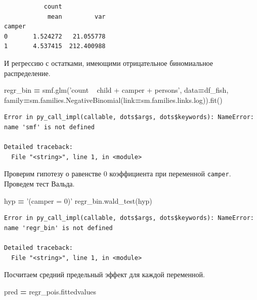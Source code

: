 \documentclass[]{book}
\newenvironment{Shaded}{\begin{snugshade}}{\end{snugshade}}
\newcommand{\NormalTok}[1]{#1}
\newcommand{\OperatorTok}[1]{\textcolor[rgb]{0.81,0.36,0.00}{\textbf{#1}}}
\newcommand{\StringTok}[1]{\textcolor[rgb]{0.31,0.60,0.02}{#1}}
\begin{document}
\begin{verbatim}
           count            
            mean         var
camper                      
0       1.524272   21.055778
1       4.537415  212.400988
\end{verbatim}

И регрессию с остатками, имеющими отрицательное биномиальное распределение.

\begin{Shaded}
\begin{Highlighting}[]
\NormalTok{regr_bin }\OperatorTok{=}\NormalTok{ smf.glm(}\StringTok{'count ~ child + camper +  persons'}\NormalTok{, data}\OperatorTok{=}\NormalTok{df_fish,}
\NormalTok{              family}\OperatorTok{=}\NormalTok{sm.families.NegativeBinomial(link}\OperatorTok{=}\NormalTok{sm.families.links.log)).fit()}
\end{Highlighting}
\end{Shaded}

\begin{verbatim}
Error in py_call_impl(callable, dots$args, dots$keywords): NameError: name 'smf' is not defined

Detailed traceback: 
  File "<string>", line 1, in <module>
\end{verbatim}

Проверим гипотезу о равенстве 0 коэффициента при переменной \texttt{camper}. Проведем тест Вальда.

\begin{Shaded}
\begin{Highlighting}[]
\NormalTok{hyp }\OperatorTok{=} \StringTok{'(camper = 0)'}
\NormalTok{regr_bin.wald_test(hyp)}
\end{Highlighting}
\end{Shaded}

\begin{verbatim}
Error in py_call_impl(callable, dots$args, dots$keywords): NameError: name 'regr_bin' is not defined

Detailed traceback: 
  File "<string>", line 1, in <module>
\end{verbatim}

Посчитаем средний предельный эффект для каждой переменной.

\begin{Shaded}
\begin{Highlighting}[]
\NormalTok{pred }\OperatorTok{=}\NormalTok{ regr_pois.fittedvalues}
\end{Highlighting}
\end{Shaded}
\end{document}
